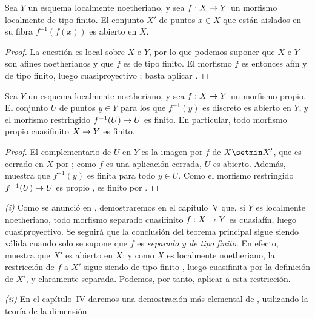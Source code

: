 \documentclass[oneside]{amsart}
\makeatletter
\newcommand{\ega@arrow}[2]{\mathchoice{#1}{#2}{#2}{#2}}
\renewcommand{\to}{\ega@arrow{\longrightarrow}{\rightarrow}}
\newcommand{\oldpage}[2][]{{\marginnote{\normalfont\textbf{#1}~|~#2}}\ignorespaces}
\let\EGAOriginalLabel\label
\renewcommand{\label}[1]{\phantomsection\EGAOriginalLabel{#1}}
\makeatother
\begin{document}
\begin{proposition}[4.4.10]
\label{III.4.4.10}
Sea $Y$ un esquema localmente noetheriano, y sea $f:X\to Y$ un
morfismo localmente de tipo finito. El conjunto $X'$ de puntos
$x\in X$ que están aislados en su fibra $f^{-1}(f(x))$ es abierto en
$X$.
\end{proposition}

\begin{proof}
La cuestión es local sobre $X$ e $Y$, por lo que podemos suponer que
$X$ e $Y$ son afines noetherianos y que $f$ es de tipo finito. El
morfismo $f$ es entonces afín y de tipo finito, luego
cuasiproyectivo ; basta aplicar
.
\end{proof}

\oldpage[III]{138}

\begin{corollary}[4.4.11]
\label{III.4.4.11}
Sea $Y$ un esquema localmente noetheriano, y sea $f:X\to Y$ un
morfismo propio. El conjunto $U$ de puntos $y\in Y$ para los que
$f^{-1}(y)$ es discreto es abierto en $Y$, y el morfismo restringido
$f^{-1}(U)\to U$ es finito. En particular, todo morfismo propio
cuasifinito $X\to Y$ es finito.
\end{corollary}

\begin{proof}
El complementario de $U$ en $Y$ es la imagen por $f$ de $X\setmin X'$, que
es cerrado en $X$ por ; como $f$ es una aplicación
cerrada, $U$ es abierto. Además,  muestra que
$f^{-1}(y)$ es finita para todo $y\in U$. Como el morfismo restringido
$f^{-1}(U)\to U$ es propio , es finito por
.
\end{proof}

\begin{remark}[4.4.12]
\label{III.4.4.12}
\emph{(i)}
Como se anunció en , demostraremos en el capítulo~V
que, si $Y$ es localmente noetheriano, todo morfismo separado
cuasifinito $f:X\to Y$ es cuasiafín, luego cuasiproyectivo. Se seguirá
que la conclusión del teorema principal  sigue siendo
válida cuando solo se supone que $f$ es \emph{separado y de tipo finito}.
En efecto,  muestra que $X'$ es abierto en $X$; y
como $X$ es localmente noetheriano, la restricción de $f$ a $X'$ sigue
siendo de tipo finito , luego cuasifinita por la
definición de $X'$, y claramente separada. Podemos, por tanto, aplicar
 a esta restricción.

\emph{(ii)}
En el capítulo~IV daremos una demostración más elemental de
, utilizando la teoría de la dimensión.
\end{remark}
\end{document}
